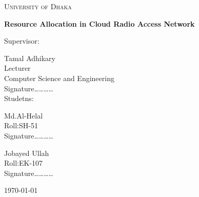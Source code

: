 \documentclass[12pt,a4paper]{report}
\begin{document}
\begin{titlepage}
\centering
{\scshape\LARGE University of Dhaka \par}
\vspace{1.5cm}
{\huge\bfseries Resource Allocation in Cloud Radio Access Network\par}
\vspace{2cm}
Supervisor:\par
\vspace{0.5cm}
Tamal Adhikary\\
Lecturer\\
Computer Science and Engineering\\
Signature\ldots\ldots\ldots\ldots\\
\vfill
Studetns:\par
\vspace{0.5cm}
\parbox{0.4\textwidth}{Md.Al-Helal\\
Roll:SH-51\\
Signature\ldots\ldots\ldots\ldots\\
}\hspace{2cm}
\parbox{0.4\textwidth}{Jobayed Ullah\\
Roll:EK-107\\
Signature\ldots\ldots\ldots\ldots\\
}
\vfill
{\large \today\par}
\end{titlepage}
\end{document}
